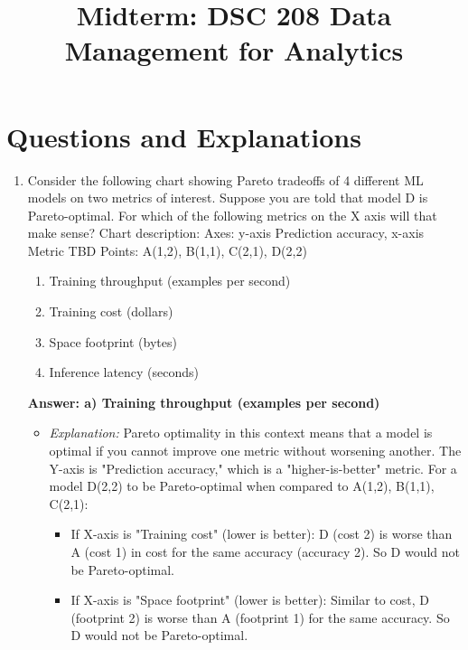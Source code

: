 \documentclass{article}
\title{Midterm: DSC 208 Data Management for Analytics}
\author{}
\date{}
\begin{document}
\maketitle

\section*{Questions and Explanations}

\begin{enumerate}[label=\textbf{Question \arabic*.}]

\item Consider the following chart showing Pareto tradeoffs of 4 different ML models on two metrics of interest. Suppose you are told that model D is Pareto-optimal. For which of the following metrics on the X axis will that make sense?
    \newline Chart description:
    \newline Axes: y-axis Prediction accuracy, x-axis Metric TBD
    \newline Points: A(1,2), B(1,1), C(2,1), D(2,2)
    \begin{enumerate}[label=\alph*)]
        \item Training throughput (examples per second)
        \item Training cost (dollars)
        \item Space footprint (bytes)
        \item Inference latency (seconds)
    \end{enumerate}
    \textbf{Answer: a) Training throughput (examples per second)}
    \begin{itemize}
        \item \textit{Explanation:} Pareto optimality in this context means that a model is optimal if you cannot improve one metric without worsening another. The Y-axis is "Prediction accuracy," which is a "higher-is-better" metric.
        For a model D(2,2) to be Pareto-optimal when compared to A(1,2), B(1,1), C(2,1):
        \begin{itemize}
            \item If X-axis is "Training cost" (lower is better): D (cost 2) is worse than A (cost 1) in cost for the same accuracy (accuracy 2). So D would not be Pareto-optimal.
            \item If X-axis is "Space footprint" (lower is better): Similar to cost, D (footprint 2) is worse than A (footprint 1) for the same accuracy. So D would not be Pareto-optimal.

\end{itemize}
\end{itemize}
\end{enumerate}
\end{document}

